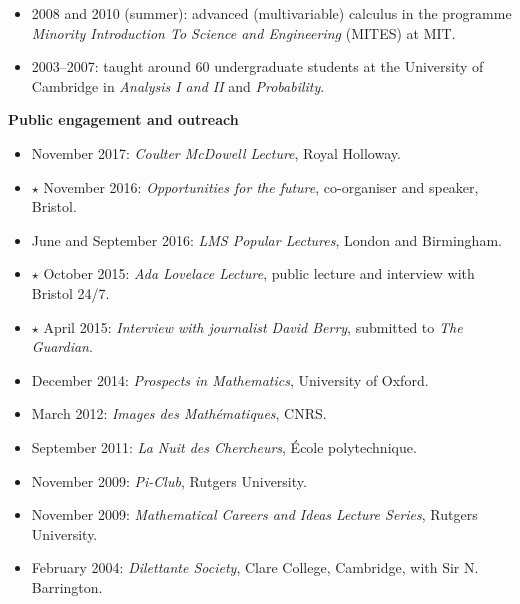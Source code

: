 \documentclass[11pt]{article}
\newenvironment{mitemize}{
\begin{itemize}
  \setlength{\itemsep}{1pt}
  \setlength{\parskip}{0pt}
  \setlength{\parsep}{0pt}
}{\end{itemize}}
\begin{document}
\begin{mitemize}
\item 2008 and 2010 (summer): advanced (multivariable) calculus in the programme \textit{Minority Introduction To Science and Engineering} (MITES) at MIT.
\item 2003--2007: taught around 60 undergraduate students at the University of Cambridge in \textit{Analysis I and II} and \textit{Probability}.
\end{mitemize}

\vspace{3pt}
\textbf{Public engagement and outreach}
\begin{mitemize}
\item November 2017: \textit{Coulter McDowell Lecture}, Royal Holloway.
\item[$\star$] November 2016: \textit{Opportunities for the future}, co-organiser and speaker, Bristol.
\item June and September 2016: \textit{LMS Popular Lectures}, London and Birmingham.
\item[$\star$] October 2015: \textit{Ada Lovelace Lecture}, public lecture and interview with Bristol 24/7.
\item[$\star$] April 2015: \textit{Interview with journalist David Berry}, submitted to \emph{The Guardian}.
\item December 2014: \textit{Prospects in Mathematics}, University of Oxford.
\item March 2012: \textit{Images des Math\'ematiques}, CNRS.
\item September 2011: \textit{La Nuit des Chercheurs}, \'Ecole polytechnique.
\item November 2009: \textit{Pi-Club}, Rutgers University.
\item November 2009: \textit{Mathematical Careers and Ideas Lecture Series}, Rutgers University.
\item February 2004: \textit{Dilettante Society}, Clare College, Cambridge, with Sir N. Barrington.
\end{mitemize}
\end{document}
